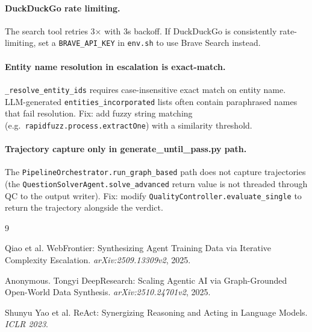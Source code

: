 \documentclass[11pt,a4paper]{article}
\begin{document}
\paragraph{DuckDuckGo rate limiting.} The search tool retries 3× with 3s backoff. If DuckDuckGo is consistently rate-limiting, set a \texttt{BRAVE\_API\_KEY} in \texttt{env.sh} to use Brave Search instead.

\paragraph{Entity name resolution in escalation is exact-match.} \texttt{\_resolve\_entity\_ids} requires case-insensitive exact match on entity name. LLM-generated \texttt{entities\_incorporated} lists often contain paraphrased names that fail resolution. Fix: add fuzzy string matching (e.g.\ \texttt{rapidfuzz.process.extractOne}) with a similarity threshold.

\paragraph{Trajectory capture only in generate\_until\_pass.py path.} The \texttt{PipelineOrchestrator.run\_graph\_based} path does not capture trajectories (the \texttt{QuestionSolverAgent.solve\_advanced} return value is not threaded through QC to the output writer). Fix: modify \texttt{QualityController.evaluate\_single} to return the trajectory alongside the verdict.


\begin{thebibliography}{9}

Qiao et al.
\newblock WebFrontier: Synthesizing Agent Training Data via Iterative Complexity Escalation.
\newblock \textit{arXiv:2509.13309v2}, 2025.

Anonymous.
\newblock Tongyi DeepResearch: Scaling Agentic AI via Graph-Grounded Open-World Data Synthesis.
\newblock \textit{arXiv:2510.24701v2}, 2025.

Shunyu Yao et al.
\newblock ReAct: Synergizing Reasoning and Acting in Language Models.
\newblock \textit{ICLR 2023}.

\end{thebibliography}
\end{document}
